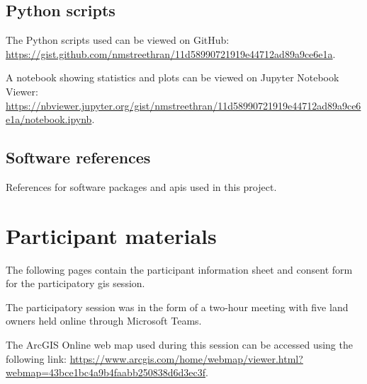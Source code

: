 \section*{Python scripts}

The Python scripts used can be viewed on GitHub:
\url{https://gist.github.com/nmstreethran/11d58990721919e44712ad89a9ce6e1a}.

A notebook showing statistics and plots can be viewed on Jupyter Notebook
Viewer:
\url{https://nbviewer.jupyter.org/gist/nmstreethran/11d58990721919e44712ad89a9ce6e1a/notebook.ipynb}.

\section*{Software references}

References for software packages and \glspl{api} used in this project.

\printbibliography[notcategory=cited,heading=none,keyword=software]

\chapter{Participant materials \label{app:pgis}}

The following pages contain the participant information sheet and consent form for the participatory \gls{gis} session.

The participatory session was in the form of a two-hour meeting with five land owners held online through Microsoft Teams.

The ArcGIS Online web map used during this session can be accessed using the following link:
\url{https://www.arcgis.com/home/webmap/viewer.html?webmap=43bce1bc4a9b4faabb250838d6d3ec3f}.

\newpage

